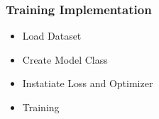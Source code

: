 \documentclass[14 pt]{beamer}
\let\olditem\item
\renewcommand{\item}{\olditem\vspace{4pt}}
\begin{document}
\begin{frame}
  \frametitle{Training  Implementation}
  \begin{itemize}
  \item Load Dataset
  \item Create Model Class
  \item Instatiate Loss and Optimizer
  \item Training
  \end{itemize}
\end{frame}
\end{document}
